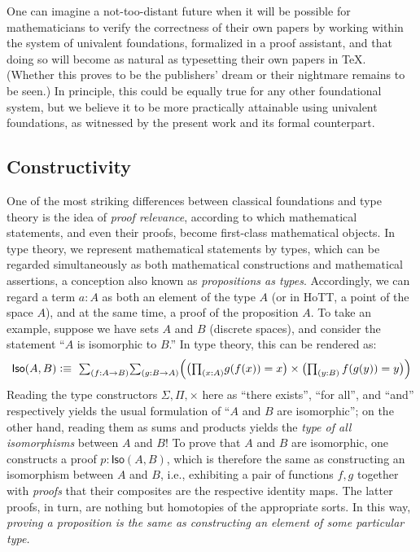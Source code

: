One can imagine a not-too-distant future when it will be possible for mathematicians to verify the correctness of their own papers by working within the system of univalent foundations, formalized in a proof assistant, and that doing so will become as natural as typesetting their own papers in \TeX.
(Whether this proves to be the publishers' dream or their nightmare remains to be seen.) 
In principle, this could be equally true for any other foundational system, but we believe it to be more practically attainable using univalent foundations, as witnessed by the present work and its formal counterpart.



\subsection*{Constructivity} 


One of the most striking differences between classical foundations and type theory is the idea of \emph{proof relevance}, according to which mathematical statements, and even their proofs, become first-class mathematical objects.
In type theory, we represent mathematical statements by types, which can be regarded simultaneously as both mathematical constructions and mathematical assertions, a conception also known as \emph{propositions as types}.
Accordingly, we can regard a term $a : A$ as both an element of the type $A$ (or in HoTT, a point of the space $A$), and at the same time, a proof of the proposition $A$.
To take an example, suppose we have sets $A$ and $B$ (discrete spaces), and consider the statement ``$A$ is isomorphic to $B$.''
In type theory, this can be rendered as:
\[
\mathsf{Iso}(A,B) \defeq\ \tsm{f : A\to B}{g : B\to A}\Bigl(\bigl(\tprd{x:A} g(f(x)) = x\bigr) \times \bigl(\tprd{y:B}\, f(g(y)) = y\bigr)\Bigr)
\]
%
Reading the type constructors $\Sigma, \Pi, \times$  here  as ``there exists'', ``for all'', and ``and'' respectively yields the usual formulation of ``$A$ and $B$ are isomorphic''; on the other hand, reading them as sums and products yields the \emph{type of all isomorphisms} between $A$ and $B$!  To prove that $A$ and $B$ are isomorphic, one  constructs a proof $p : \mathsf{Iso}(A,B)$, which is therefore the same  as constructing an isomorphism between $A$ and $B$, i.e., exhibiting a pair of functions $f, g$ together with \emph{proofs} that their composites are the respective identity maps.  The latter proofs, in turn, are nothing but homotopies of the appropriate sorts.  In this way, \emph{proving a proposition is the same as constructing an element of some particular type.}

